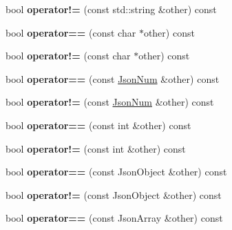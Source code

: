 \begin{DoxyCompactItemize}
bool {\bfseries operator!=} (const std\+::string \&other) const
\item 
\mbox{\label{classnta_1_1utils_1_1Json_a5ed2511971393973e89721cdebefd839}} 
bool {\bfseries operator==} (const char $\ast$other) const
\item 
\mbox{\label{classnta_1_1utils_1_1Json_a8ff4372a5deec91c76406aa9db38fb29}} 
bool {\bfseries operator!=} (const char $\ast$other) const
\item 
\mbox{\label{classnta_1_1utils_1_1Json_afd19449d8c0ef71a4a5e3544841f9e9b}} 
bool {\bfseries operator==} (const \hyperlink{classnta_1_1utils_1_1JsonNum}{Json\+Num} \&other) const
\item 
\mbox{\label{classnta_1_1utils_1_1Json_a0fe90155a63c4de53af0d2568e526701}} 
bool {\bfseries operator!=} (const \hyperlink{classnta_1_1utils_1_1JsonNum}{Json\+Num} \&other) const
\item 
\mbox{\label{classnta_1_1utils_1_1Json_a7508ebbd9d94e223b75d942056b6f1d3}} 
bool {\bfseries operator==} (const int \&other) const
\item 
\mbox{\label{classnta_1_1utils_1_1Json_abd71013faafbf7ed1d0c2eb13ef22102}} 
bool {\bfseries operator!=} (const int \&other) const
\item 
\mbox{\label{classnta_1_1utils_1_1Json_a07c84e02229b829d3ce687a47251c28e}} 
bool {\bfseries operator==} (const Json\+Object \&other) const
\item 
\mbox{\label{classnta_1_1utils_1_1Json_a2c47bda59351fc39af7d01af617c8e51}} 
bool {\bfseries operator!=} (const Json\+Object \&other) const
\item 
\mbox{\label{classnta_1_1utils_1_1Json_a4f8c29566c86919ab1693e4ab709a1b5}} 
bool {\bfseries operator==} (const Json\+Array \&other) const
\item 
\mbox{\label{classnta_1_1utils_1_1Json_a45778e95342f5b95a9f69273eb481f48}} 

\end{DoxyCompactItemize}
